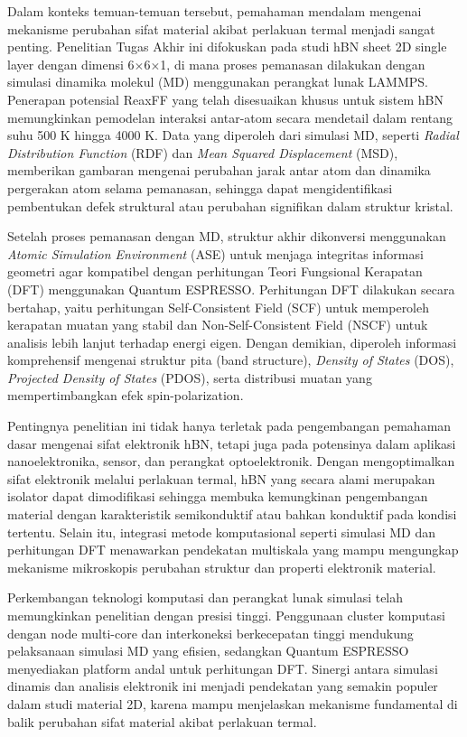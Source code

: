 Dalam konteks temuan-temuan tersebut, pemahaman mendalam mengenai mekanisme perubahan sifat material akibat perlakuan termal menjadi sangat penting. Penelitian Tugas Akhir ini difokuskan pada studi hBN sheet 2D single layer dengan dimensi 6$\times$6$\times$1, di mana proses pemanasan dilakukan dengan simulasi dinamika molekul (MD) menggunakan perangkat lunak LAMMPS. Penerapan potensial ReaxFF yang telah disesuaikan khusus untuk sistem hBN memungkinkan pemodelan interaksi antar-atom secara mendetail dalam rentang suhu 500 K hingga 4000 K. Data yang diperoleh dari simulasi MD, seperti \textit{Radial Distribution Function} (RDF) dan \textit{Mean Squared Displacement} (MSD), memberikan gambaran mengenai perubahan jarak antar atom dan dinamika pergerakan atom selama pemanasan, sehingga dapat mengidentifikasi pembentukan defek struktural atau perubahan signifikan dalam struktur kristal.

Setelah proses pemanasan dengan MD, struktur akhir dikonversi menggunakan \textit{Atomic Simulation Environment} (ASE) untuk menjaga integritas informasi geometri agar kompatibel dengan perhitungan Teori Fungsional Kerapatan (DFT) menggunakan Quantum ESPRESSO. Perhitungan DFT dilakukan secara bertahap, yaitu perhitungan Self-Consistent Field (SCF) untuk memperoleh kerapatan muatan yang stabil dan Non-Self-Consistent Field (NSCF) untuk analisis lebih lanjut terhadap energi eigen. Dengan demikian, diperoleh informasi komprehensif mengenai struktur pita (band structure), \textit{Density of States} (DOS), \textit{Projected Density of States} (PDOS), serta distribusi muatan yang mempertimbangkan efek spin-polarization.

Pentingnya penelitian ini tidak hanya terletak pada pengembangan pemahaman dasar mengenai sifat elektronik hBN, tetapi juga pada potensinya dalam aplikasi nanoelektronika, sensor, dan perangkat optoelektronik. Dengan mengoptimalkan sifat elektronik melalui perlakuan termal, hBN yang secara alami merupakan isolator dapat dimodifikasi sehingga membuka kemungkinan pengembangan material dengan karakteristik semikonduktif atau bahkan konduktif pada kondisi tertentu. Selain itu, integrasi metode komputasional seperti simulasi MD dan perhitungan DFT menawarkan pendekatan multiskala yang mampu mengungkap mekanisme mikroskopis perubahan struktur dan properti elektronik material.

Perkembangan teknologi komputasi dan perangkat lunak simulasi telah memungkinkan penelitian dengan presisi tinggi. Penggunaan cluster komputasi dengan node multi-core dan interkoneksi berkecepatan tinggi mendukung pelaksanaan simulasi MD yang efisien, sedangkan Quantum ESPRESSO menyediakan platform andal untuk perhitungan DFT. Sinergi antara simulasi dinamis dan analisis elektronik ini menjadi pendekatan yang semakin populer dalam studi material 2D, karena mampu menjelaskan mekanisme fundamental di balik perubahan sifat material akibat perlakuan termal.

